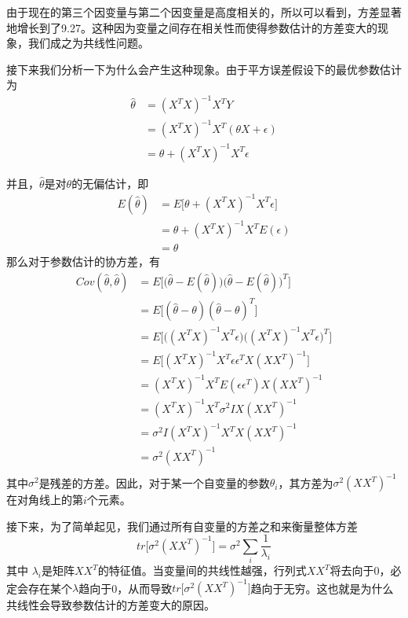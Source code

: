 由于现在的第三个因变量与第二个因变量是高度相关的，所以可以看到，方差显著地增长到了9.27。这种因为变量之间存在相关性而使得参数估计的方差变大的现象，我们成之为共线性问题。

接下来我们分析一下为什么会产生这种现象。由于平方误差假设下的最优参数估计为
\begin{equation}
\begin{split}
	\hat{\theta} &= (X^TX)^{-1}X^TY \\ 
	&= (X^TX)^{-1}X^T(\theta X + \epsilon)\\
	&= \theta + (X^TX)^{-1}X^T\epsilon
\end{split}
\end{equation}

并且，$\hat{\theta}$是对$\theta$的无偏估计，即
\begin{equation}
\begin{split}
	E(\hat{\theta}) &= E\big[\theta + (X^TX)^{-1}X^T\epsilon\big] \\
	&=\theta + (X^TX)^{-1}X^TE(\epsilon) \\
	&=\theta
\end{split}
\end{equation}
那么对于参数估计的协方差，有
\begin{equation}
\begin{split}
Cov(\hat{\theta}, \hat{\theta}) &= E\Big[\big(\hat{\theta} - E(\hat{\theta})\big)\big(\hat{\theta} - E(\hat{\theta})\big)^T\Big] \\
&= E\Big[(\hat{\theta} - \theta)(\hat{\theta} - \theta)^T\Big] \\
&= E\Big[\big((X^TX)^{−1}X^T\epsilon\big)\big((X^TX)^{−1}X^T\epsilon\big)^T\Big] \\
&= E\Big[(X^TX)^{−1}X^T\epsilon\epsilon^TX(XX^T)^{−1}\Big] \\
&= (X^TX)^{−1}X^TE(\epsilon\epsilon^T)X(XX^T)^{−1}\\
&= (X^TX)^{−1}X^T\sigma^2 IX(XX^T)^{−1}\\
&= \sigma^2 I(X^TX)^{−1}X^TX(XX^T)^{−1}\\
&= \sigma^2 (XX^T)^{−1}\\
\end{split}
\end{equation}
其中$\sigma^2$是残差的方差。因此，对于某一个自变量的参数$\theta_i$，其方差为$\sigma^2(XX^T)^{−1}$在对角线上的第$i$个元素。

接下来，为了简单起见，我们通过所有自变量的方差之和来衡量整体方差
\begin{equation}
	tr\big[\sigma^2(XX^T)^{−1}\big] = \sigma^2\sum_i\frac{1}{\lambda_i}
\end{equation}
其中 $\lambda_i$是矩阵$XX^T$的特征值。当变量间的共线性越强，行列式$XX^T$将去向于0，必定会存在某个$\lambda$趋向于0，从而导致$tr\big[\sigma^2(XX^T)^{−1}\big]$趋向于无穷。这也就是为什么共线性会导致参数估计的方差变大的原因。

